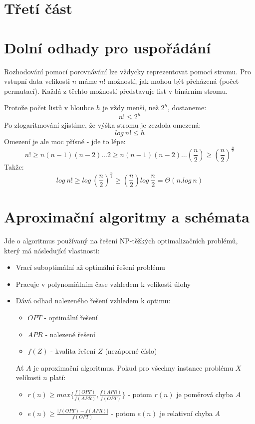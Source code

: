 \documentclass[a4paper]{article}      %
\newenvironment{definition}[1][Definice]{\begin{trivlist}
\item[\hskip \labelsep {\bfseries #1}]}{\end{trivlist}}
\begin{document}
\section{Třetí část}

\section{Dolní odhady pro uspořádání}
Rozhodování pomocí porovnávání lze vždycky reprezentovat pomocí stromu. Pro vstupní data velikosti $n$ máme $n!$ možností,
jak mohou být přeházená (počet permutací). Každá z těchto možností představuje list v binárním stromu.

Protože počet listů v hloubce $h$ je vždy menší, než $2^{h}$, dostaneme:
\[
n! \leq 2^{h}
\]
Po zlogaritmování zjistíme, že výška stromu je zezdola omezená:
\[
log\ n! \leq h
\]
Omezení je ale moc přísné - jde to lépe:
\[
n! \geq n(n-1)(n-2)\ldots2 \geq n(n-1)(n-2)\ldots \left( \frac{n}{2} \right) \geq \left( \frac{n}{2}\right)^{\frac{n}{2}}
\]
Takže:
\[
log\ n! \geq log\ \left( \frac{n}{2}\right)^{\frac{n}{2}} \geq \left( \frac{n}{2}\right) log\ \frac{n}{2} = \Theta(n.log\ n)
\]

\section{Aproximační algoritmy a schémata}

\begin{definition}[Aproximační algoritmus]
Jde o algoritmus používaný na řešení NP-těžkých optimalizačních problémů, který má následující vlastnosti:
\begin{itemize}
\item Vrací suboptimální až optimální řešení problému
\item Pracuje v polynomiálním čase vzhledem k velikosti úlohy
\item Dává odhad nalezeného řešení vzhledem k optimu:
	\begin{itemize}
		\item $OPT$ - optimální řešení
		\item $APR$ - nalezené řešení
		\item $f(Z)$ - kvalita řešení $Z$ (nezáporné číslo)
	\end{itemize}
Ať $A$ je aproximační algoritmus. Pokud pro všechny instance problému $X$ velikosti $n$ platí:
\begin{itemize}
\item $r(n) \geq max\lbrace \frac{f(OPT)}{f(APR)},\frac{f(APR)}{f(OPT)}\rbrace$ - potom $r(n)$ je poměrová chyba $A$
\item $e(n) \geq \frac{|f(OPT) - f(APR)|}{f(OPT)}$ - potom $e(n)$ je relativní chyba $A$ 
\end{itemize}
\end{itemize}
\end{definition}
\end{document}
